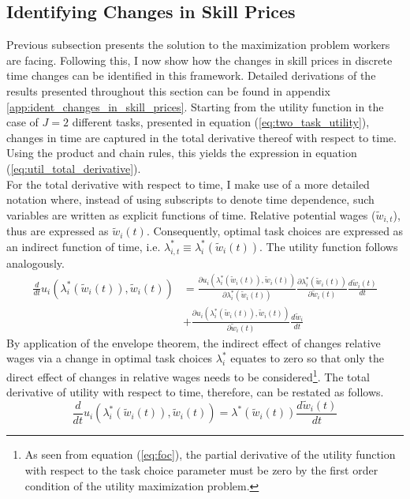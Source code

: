 \documentclass[../main.tex]{subfiles}
\begin{document}
\subsection{Identifying Changes in Skill Prices} \label{sec:identifying-changes-in-skill-prices}
Previous subsection presents the solution to the maximization problem workers are facing. Following this, I now show how the changes in skill prices in discrete time changes can be identified in this framework. Detailed derivations of the results presented throughout this section can be found in appendix \ref{app:ident_changes_in_skill_prices}. Starting from the utility function in the case of $J=2$ different tasks, presented in equation (\ref{eq:two_task_utility}), changes in time are captured in the total derivative thereof with respect to time. Using the product and chain rules, this yields the expression in equation (\ref{eq:util_total_derivative}).
\\
For the total derivative with respect to time, I make use of a more detailed notation where, instead of using subscripts to denote time dependence, such variables are written as explicit functions of time. Relative potential wages ($\tilde{w}_{i,t}$), thus are expressed as $\tilde{w}_{i}(t)$. Consequently, optimal task choices are expressed as an indirect function of time, i.e. $\lambda_{i,t}^* \equiv \lambda_i^*(\tilde{w}_i (t))$. The utility function follows analogously.
\begin{align} \label{eq:util_total_derivative}
	\frac{d }{dt} u_{i}(\lambda_i^*(\tilde{w}_i(t)), \tilde{w}_i(t)) &=	\frac{\partial u_i(\lambda_i^*(\tilde{w}_i(t)), \tilde{w}_i(t))}{\partial \lambda_i^*(\tilde{w}_i(t))} \frac{\partial \lambda_i^*(\tilde{w}_i(t))}{\partial \tilde{w}_i(t)}  \frac{d \tilde{w}_i(t)}{dt} \nonumber \\
	{} &+ \frac{\partial u_i(\lambda_i^*(\tilde{w}_i(t)), \tilde{w}_i(t))} {\partial \tilde{w}_i(t)} \frac{d \tilde{w}_i}{dt} 
\end{align}
By application of the envelope theorem, the indirect effect of changes relative wages via a change in optimal task choices $\lambda_i^*$ equates to zero so that only the direct effect of changes in relative wages needs to be considered\footnote{As seen from equation (\ref{eq:foc}), the partial derivative of the utility function with respect to the task choice parameter must be zero by the first order condition of the utility maximization problem.}. The total derivative of utility with respect to time, therefore, can be restated as follows.
\begin{equation} \label{eq:util_derivative_env_th}
	\frac{d }{dt} u_{i}(\lambda_i^*(\tilde{w}_i(t)), \tilde{w}_i(t)) = \lambda^*(\tilde{w}_i(t)) \frac{d \tilde{w}_i (t)}{d t}
\end{equation}
\end{document}
